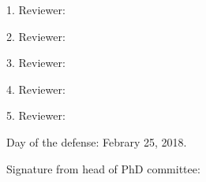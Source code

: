 
\newpage
\vspace{10mm}
1. Reviewer: 

\vspace{10mm}
2. Reviewer:

\vspace{10mm}
3. Reviewer:

\vspace{10mm}
4. Reviewer:

\vspace{10mm}
5. Reviewer:


\vspace{40mm}
Day of the defense: Febrary 25, 2018.

\vspace{20mm}\hspace{70mm}

Signature from head of PhD committee:



